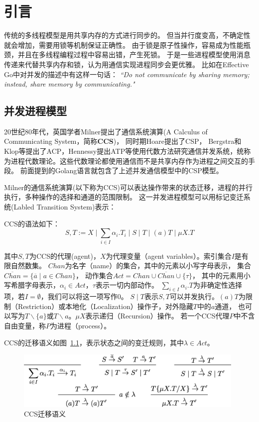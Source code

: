 
\chapter{引言}
   传统的多线程模型是用共享内存的方式进行同步的。
   但当并行度变高，不确定性就会增加，需要用锁等机制保证正确性。
   由于锁是原子性操作，容易成为性能瓶颈，并且在多线程编程过程中容易出错，产生死锁。
   于是一些进程模型使用消息传递来代替共享内存和锁，认为用通信实现进程同步会更优雅。
   比如在Effective Go中对并发的描述中有这样一句话：
   \textit{“Do not communicate by sharing memory; instead, share memory by communicating."}\cite{1}


   \section{并发进程模型}
   20世纪80年代，英国学者Milner提出了通信系统演算(A Calculus of Communicating System，简称\textbf{CCS})\cite{2}，
   同时期Hoare提出了CSP\cite{3}，
   Bergstra和Klop等提出了ACP\cite{4}，Hennessy提出ATP\cite{5}等使用代数方法研究通信并发系统，统称为进程代数理论。这些代数理论都使用通信而不是共享内存作为进程之间交互的手段。
   前面提到的Golang语言就包含了上述并发通信模型中的CSP模型。

   Milner的通信系统演算(以下称为CCS)可以表达操作带来的状态迁移，进程的并行执行，多种操作的选择和通道的范围限制。
   这一并发进程模型可以用标记变迁系统(Labled Transition System)表示：

   CCS的语法如下：
   $$S,T:=X\mid \sum_{i\in I}\alpha_i.T_i\mid S\mid T \mid (a)T \mid \mu X.T$$

   其中$S,T$为CCS的代理(agent)，$X$为代理变量（agent variables）。索引集合$I$是有限自然数集。
   $Chan$为名字（name）的集合，其中的元素以小写字母表示，
   集合$\overline{Chan}=\{\overline{a}\mid a\in Chan\}$，
   动作集合$Act=Chan\cup \overline{Chan}\cup \{\tau\} $，
   其中的元素用小写希腊字母表示，$\alpha_i\in Act$，$\tau$表示一切内部动作。
   $\sum_{i\in I}\alpha_i.T$为非确定性选择项，若$I=\emptyset$，我们可以将这一项写作$0$。
   $S\mid T$表示$S,T$可以并发执行。$(a)T$为限制（Restriction）或本地化（Localization）操作子，对外隐藏$T$中的$a$通道，
   也可以写为$T\backslash \{a\}$或$T\backslash a$。$\mu X$表示递归（Recursion）操作。
   若一个CCS代理$P$中不含自由变量，称$P$为进程（process）。

   CCS的迁移语义如图~\ref{fig_ccs}，表示状态之间的变迁规则，其中$\lambda \in Act$。

   \begin{figure}[!htbp]
    \small
    \centering
    \includegraphics[width=11cm]{../figure/ccs.png}
    \caption[]{CCS迁移语义}
     \label{fig_ccs}
 \end{figure}

